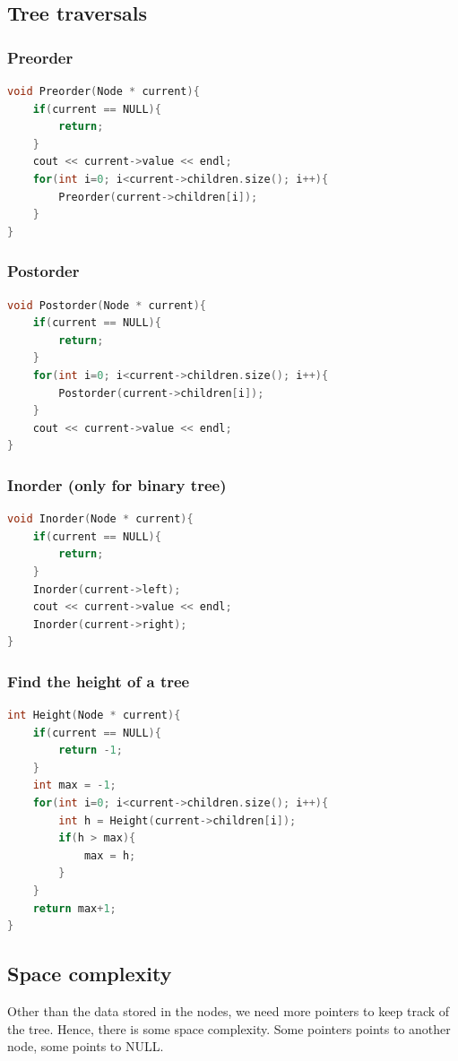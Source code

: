 \documentclass[letterpaper,12pt]{article}
\begin{document}
\subsection{Tree traversals}
\subsubsection{Preorder}
\begin{lstlisting}[language=C++]
void Preorder(Node * current){
    if(current == NULL){
        return;
    }
    cout << current->value << endl;
    for(int i=0; i<current->children.size(); i++){
        Preorder(current->children[i]);
    }
}
\end{lstlisting}
\subsubsection{Postorder}
\begin{lstlisting}[language=C++]
void Postorder(Node * current){
    if(current == NULL){
        return;
    }
    for(int i=0; i<current->children.size(); i++){
        Postorder(current->children[i]);
    }
    cout << current->value << endl;
}
\end{lstlisting}
\subsubsection{Inorder (only for binary tree)}
\begin{lstlisting}[language=C++]
void Inorder(Node * current){
    if(current == NULL){
        return;
    }
    Inorder(current->left);
    cout << current->value << endl;
    Inorder(current->right);
}
\end{lstlisting}
\subsubsection{Find the height of a tree}
\begin{lstlisting}[language=C++]
int Height(Node * current){
    if(current == NULL){
        return -1;
    }
    int max = -1;
    for(int i=0; i<current->children.size(); i++){
        int h = Height(current->children[i]);
        if(h > max){
            max = h;
        }
    }
    return max+1;
}
\end{lstlisting}
\subsection{Space complexity}
Other than the data stored in the nodes, we need more pointers to keep track of the tree. Hence, there is some space complexity. Some pointers points to another node, some points to NULL. 
\end{document}
